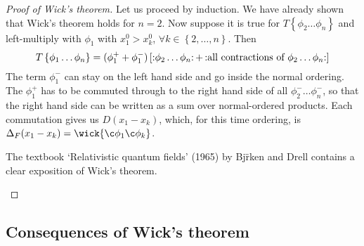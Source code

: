 \begin{proof}[Proof of Wick's theorem]
  Let us proceed by induction. We have already shown that Wick's theorem holds for $n = 2$. 
  Now suppose it is true for $T \left\{ \phi_2 \dots \phi_n \right\}$ and left-multiply with $\phi_1$ with $x_1^0 > x_k^0$, $\forall k \in \left\{ 2, \dots, n \right\}$.
  Then 
  \begin{equation}
    T \left\{ \phi_1 \dots \phi_n \right\} = (\phi^+_1 + \phi^-_1) \left[ \mathop{:}\nolimits\!\phi_2 \dots \phi_n \!\mathop{:}\nolimits + \mathop{:}\nolimits\!\text{all contractions of }\phi_2 \dots \phi_n \!\mathop{:}\nolimits \right]
  \end{equation}
  The term $\phi^-_1$ can stay on the left hand side and go inside the normal ordering. The $\phi^+_1$ has to be commuted through to the right hand side of all $\phi^-_2 \dots \phi^-_n$, so that the right hand side can be written as a sum over normal-ordered products.
  Each commutation gives us $D(x_1 - x_k)$, which, for this time ordering, is $\Delta_F(x_1 - x_k) = \wick{\c\phi_1 \c\phi_k}$.
  \begin{leftbar}
    \begin{remark}
      The textbook `Relativistic quantum fields' (1965) by Bj\"rken and Drell contains a clear exposition of Wick's theorem.
    \end{remark}
  \end{leftbar}
\end{proof}

\subsection*{Consequences of Wick's theorem}%


